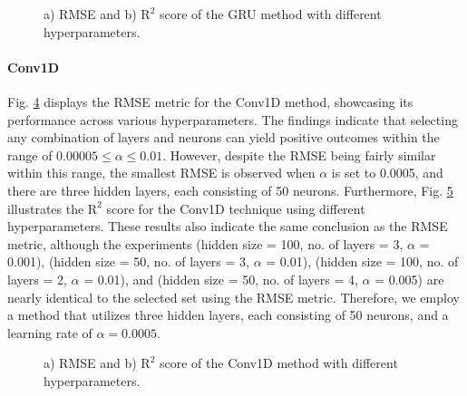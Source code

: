 \documentclass[journal,onecolumn]{IEEEtran}
\begin{document}
{\begin{appendices}
\begin{figure}[htbp]
    \centering
    \begin{subfigure}[b]{0.5\linewidth}
        \centering
        
        \caption{}
        \label{fig:rmse-gru}
    \end{subfigure}%
    \begin{subfigure}[b]{0.5\linewidth}
        \centering
        
        \caption{}
        \label{fig:r2-gru}
    \end{subfigure}
    \caption{a) RMSE and b) $\text{R}^2$ score of the GRU method with different hyperparameters.}
    \label{fig:gru-hypers}
\end{figure}

\paragraph{Conv1D}
Fig. \ref{fig:rmse-conv1d} displays the RMSE metric for the Conv1D method, showcasing its performance across various hyperparameters. The findings indicate that selecting any combination of layers and neurons can yield positive outcomes within the range of $0.00005 \le \alpha \le 0.01$. However, despite the RMSE being fairly similar within this range, the smallest RMSE is observed when $\alpha$ is set to 0.0005, and there are three hidden layers, each consisting of 50 neurons. Furthermore, Fig. \ref{fig:r2-conv1d} illustrates the $\text{R}^2$ score for the Conv1D technique using different hyperparameters. These results also indicate the same conclusion as the RMSE metric, although the experiments (hidden size = 100, no. of layers = 3, $\alpha$ = 0.001), (hidden size = 50, no. of layers = 3, $\alpha$ = 0.01), (hidden size = 100, no. of layers = 2, $\alpha$ = 0.01), and (hidden size = 50, no. of layers = 4, $\alpha$ = 0.005) are nearly identical to the selected set using the RMSE metric. Therefore, we employ a method that utilizes three hidden layers, each consisting of 50 neurons, and a learning rate of $\alpha=0.0005$. 

\begin{figure}[htbp]
    \centering
    \begin{subfigure}[b]{0.5\linewidth}
        \centering
        
        \caption{}
        \label{fig:rmse-conv1d}
    \end{subfigure}%
    \begin{subfigure}[b]{0.5\linewidth}
        \centering
        
        \caption{}
        \label{fig:r2-conv1d}
    \end{subfigure}
    \caption{a) RMSE and b) $\text{R}^2$ score of the Conv1D method with different hyperparameters.}
    \label{fig:conv1d-hypers}
\end{figure}


\end{appendices}}
\end{document}
